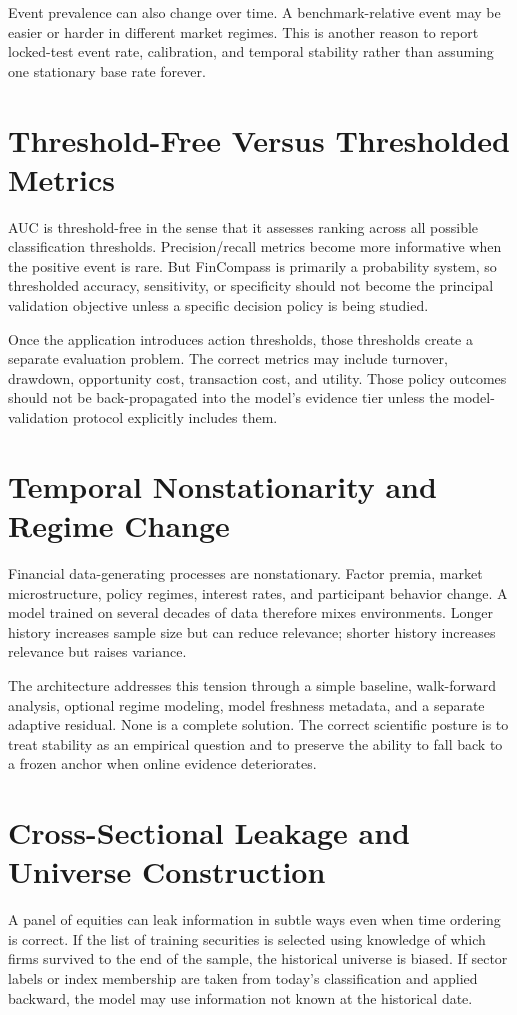\documentclass[11pt]{article}
\begin{document}
Event prevalence can also change over time. A benchmark-relative event may be easier or harder in different market regimes. This is another reason to report locked-test event rate, calibration, and temporal stability rather than assuming one stationary base rate forever.

\section{Threshold-Free Versus Thresholded Metrics}
AUC is threshold-free in the sense that it assesses ranking across all possible classification thresholds. Precision/recall metrics become more informative when the positive event is rare. But FinCompass is primarily a probability system, so thresholded accuracy, sensitivity, or specificity should not become the principal validation objective unless a specific decision policy is being studied.

Once the application introduces action thresholds, those thresholds create a separate evaluation problem. The correct metrics may include turnover, drawdown, opportunity cost, transaction cost, and utility. Those policy outcomes should not be back-propagated into the model's evidence tier unless the model-validation protocol explicitly includes them.

\section{Temporal Nonstationarity and Regime Change}
Financial data-generating processes are nonstationary. Factor premia, market microstructure, policy regimes, interest rates, and participant behavior change. A model trained on several decades of data therefore mixes environments. Longer history increases sample size but can reduce relevance; shorter history increases relevance but raises variance.

The architecture addresses this tension through a simple baseline, walk-forward analysis, optional regime modeling, model freshness metadata, and a separate adaptive residual. None is a complete solution. The correct scientific posture is to treat stability as an empirical question and to preserve the ability to fall back to a frozen anchor when online evidence deteriorates.

\section{Cross-Sectional Leakage and Universe Construction}
A panel of equities can leak information in subtle ways even when time ordering is correct. If the list of training securities is selected using knowledge of which firms survived to the end of the sample, the historical universe is biased. If sector labels or index membership are taken from today's classification and applied backward, the model may use information not known at the historical date.
\end{document}
